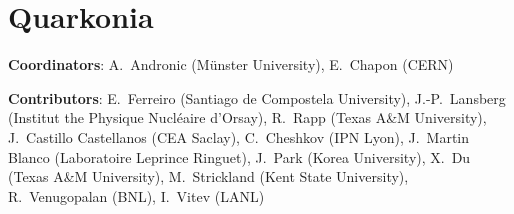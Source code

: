 \documentclass[../report.tex]{subfiles}
\begin{document}
\section{Quarkonia}

\label{sec:quarkonia}

{ \small
\noindent \textbf{Coordinators}: A.~Andronic (M\"{u}nster University), E.~Chapon (CERN)

\noindent \textbf{Contributors}: 
E.~Ferreiro (Santiago de Compostela University), J.-P.~Lansberg (Institut the Physique Nucl\'{e}aire d'Orsay), R.~Rapp (Texas A\&M University),
J.~Castillo Castellanos (CEA Saclay),
C.~Cheshkov (IPN Lyon),
J.~Martin Blanco (Laboratoire Leprince Ringuet),
J.~Park (Korea University), 
X.~Du (Texas A\&M University),
M.~Strickland (Kent State University), R.~Venugopalan (BNL), I.~Vitev (LANL)
}

\end{document}
